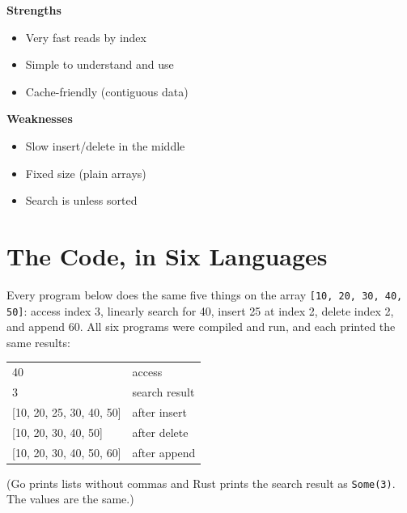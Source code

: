 \documentclass[11pt,a4paper]{article}
\begin{document}
\begin{tcolorbox}[enhanced,colback=good!6,colframe=good!60,boxrule=0.6pt,arc=3pt,sidebyside,sidebyside gap=8pt,lower separated=false,before skip=8pt,after skip=8pt]
\textbf{\color{good}Strengths}
\begin{itemize}[leftmargin=1.1em,itemsep=1pt,topsep=2pt]
  \item Very fast reads by index
  \item Simple to understand and use
  \item Cache-friendly (contiguous data)
\end{itemize}
\tcblower
\textbf{\color{bad}Weaknesses}
\begin{itemize}[leftmargin=1.1em,itemsep=1pt,topsep=2pt]
  \item Slow insert/delete in the middle
  \item Fixed size (plain arrays)
  \item Search is  unless sorted
\end{itemize}
\end{tcolorbox}

\section{The Code, in Six Languages}\label{s:code}

Every program below does the same five things on the array \texttt{[10, 20, 30, 40, 50]}: access index 3, linearly search for 40, insert 25 at index 2, delete index 2, and append 60. All six programs were compiled and run, and each printed the same results:

\begin{center}
\ttfamily\small
\begin{tabular}{@{}ll@{}}
40 & \textcolor{cmt}{access} \\
3 & \textcolor{cmt}{search result} \\
{[10, 20, 25, 30, 40, 50]} & \textcolor{cmt}{after insert} \\
{[10, 20, 30, 40, 50]} & \textcolor{cmt}{after delete} \\
{[10, 20, 30, 40, 50, 60]} & \textcolor{cmt}{after append}
\end{tabular}
\end{center}
{\small\color{cmt}(Go prints lists without commas and Rust prints the search result as \texttt{Some(3)}. The values are the same.)}

\end{document}
